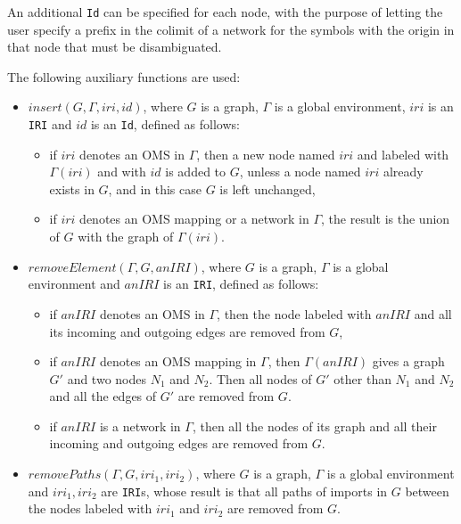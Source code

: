 \documentclass[10pt, a4paper]{isov2}
\newcommand*{\syntax}[1]{\texttt{#1}}
\begin{document}
An additional \syntax{Id} can be specified for each node, with the purpose of letting the user specify a
prefix in the colimit of a network for the symbols with the origin in that node that must be disambiguated.

 The following auxiliary functions are used:

\begin{itemize}
\item $insert(G, \Gamma, iri,id)$, where $G$ is a graph,
      $\Gamma$ is a global environment, $iri$ is an \syntax{IRI} and
      $id$ is an \syntax{Id}, defined as follows:
 \begin{itemize}
    \item if $iri$ denotes an OMS in $\Gamma$, then
                 a new node named $iri$ and labeled with $\Gamma(iri)$ and with $id$ is added to $G$,
                 unless a node named $iri$ already exists in $G$, and in this case $G$ is left unchanged,
   \item if $iri$ denotes an OMS mapping
      or a network in $\Gamma$,
      the result is the union of $G$ with the graph of $\Gamma(iri)$.
 \end{itemize}

\item $removeElement(\Gamma, G, anIRI)$, where $G$ is a graph,
      $\Gamma$ is a global environment and $anIRI$ is an \syntax{IRI},
      defined as follows:

 \begin{itemize}
    \item if $anIRI$ denotes an OMS in $\Gamma$,
          then the node labeled with $anIRI$ and all its incoming and outgoing
                edges are removed from $G$,
   \item  if $anIRI$ denotes an OMS mapping in $\Gamma$, then
   $\Gamma(anIRI)$ gives a graph $G'$ and two nodes
   $N_1$ and $N_2$. Then all nodes of $G'$ other than $N_1$ and
   $N_2$ and all the edges of $G'$ are removed from $G$.
   \item if $anIRI$ is a network in $\Gamma$, then all the nodes of its graph and all their incoming and outgoing edges are removed
               from $G$.
 \end{itemize}

 \item $removePaths(\Gamma, G, iri_1, iri_2)$, where $G$ is a graph,
      $\Gamma$ is a global environment and $iri_1, iri_2$ are \syntax{IRI}s,
 whose result is that
 all paths of imports in $G$ between the nodes labeled with
 $iri_1$ and $iri_2$ are removed from $G$.

\end{itemize}
\end{document}
